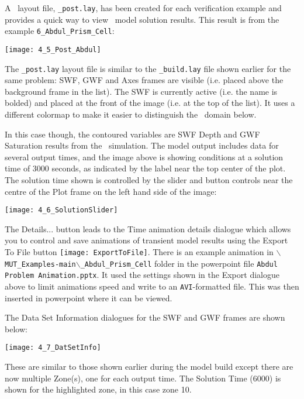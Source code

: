 A \tecplot\ layout file, \texttt{\_post.lay}, has been created for each verification example and  provides a quick way to view \mfus\ model solution results.  This result is from the example {\tt 6\_Abdul\_Prism\_Cell}:

        \texttt{[image: 4\_5\_Post\_Abdul]}

The {\tt \_post.lay} layout file is similar to the {\tt \_build.lay} file shown earlier for the same problem: {\sf  SWF, GWF} and {\sf Axes} frames are visible (i.e. placed above the {\sf background} frame in the list).  The {\sf SWF} is currently active (i.e. the name is bolded) and placed at the front of the image (i.e. at the top of the list). It uses a different colormap to make it easier to distinguish the \gwf\ domain below.

In this case though, the contoured variables are {\sf SWF Depth} and {\sf GWF Saturation} results from the \mfus\ simulation.  The model output includes data for several output times, and the image above is showing conditions at a solution time of 3000 seconds, as indicated by the label near the top center of the plot.  The solution time shown is controlled by the slider and button controls near the centre of the {\sf Plot} frame on the left hand side of the image:

        \texttt{[image: 4\_6\_SolutionSlider]}

The {\sf Details...} button leads to the {\sf Time animation details} dialogue which allows you to control and save animations of transient model results using the {\sf Export To File} button \texttt{[image: ExportToFile]}.  There is an example animation in  \texttt{$\backslash$MUT\_Examples-main$\backslash$\_Abdul\_Prism\_Cell} folder in the powerpoint file {\tt Abdul Problem Animation.pptx}.  It used the settings shown in the {\sf Export} dialogue above to limit animations speed and write to an {\tt AVI}-formatted file.  This was then inserted in powerpoint where it can be viewed.

The {\sf Data Set Information} dialogues for the {\sf SWF} and {\sf GWF} frames are shown below:

        \texttt{[image: 4\_7\_DatSetInfo]}

These are similar to those shown earlier during the model build except there are now multiple {\sf Zone(s)}, one for each output time.  The {\sf Solution Time} (6000) is shown for the highlighted zone, in this case zone 10.

